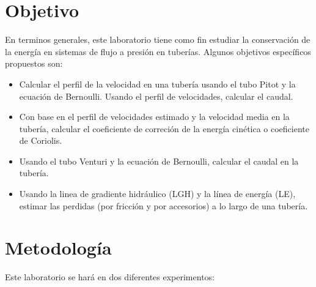 \documentclass[10pt, a4paper]{exam}
\begin{document}
\section{Objetivo}
En terminos generales, este laboratorio tiene como fin estudiar la conservaci\'on de la energ\'ia en sistemas de flujo a presi\'on en tuber\'ias. Algunos objetivos espec\'ificos propuestos son:
\begin{itemize}
\item Calcular el perfil de la velocidad en una tuber\'ia usando el tubo Pitot y la ecuaci\'on de Bernoulli. Usando el perfil de velocidades, calcular el caudal. 
\item Con base en el perfil de velocidades estimado y la velocidad media en la tuber\'ia, calcular el coeficiente de correci\'on de la energ\'ia cin\'etica o coeficiente de Coriolis.
\item Usando el tubo Venturi y la ecuaci\'on de Bernoulli, calcular el caudal en la tuber\'ia. 
\item Usando la linea de gradiente hidr\'aulico (LGH) y la l\'inea de energ\'ia (LE), estimar las perdidas (por fricci\'on y por accesorios) a lo largo de una tuber\'ia. 
\end{itemize}

\section{Metodolog\'ia}
Este laboratorio se har\'a en dos diferentes experimentos:
\end{document}
